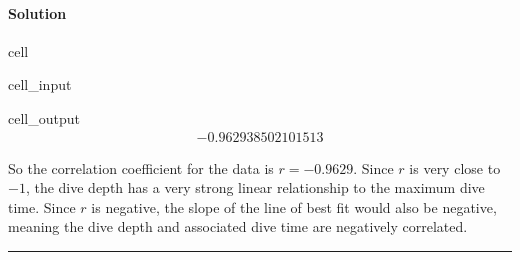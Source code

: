 \documentclass[letterpaper,10pt,english]{jupyterBook}
\begin{document}
\paragraph{Solution}
\label{\detokenize{Ch8 Correlation and Linear Regression/8.4 The Correlation Coefficient:solution}}
\begin{sphinxuseclass}{cell}\begin{sphinxVerbatimInput}

\begin{sphinxuseclass}{cell_input}
\begin{sphinxVerbatim}[commandchars=\\\{\}]

\end{sphinxVerbatim}

\end{sphinxuseclass}\end{sphinxVerbatimInput}
\begin{sphinxVerbatimOutput}

\begin{sphinxuseclass}{cell_output}\begin{equation*}
\begin{split}-0.962938502101513\end{split}
\end{equation*}
\end{sphinxuseclass}\end{sphinxVerbatimOutput}

\end{sphinxuseclass}
\sphinxAtStartPar
So the correlation coefficient for the data is \(r = -0.9629\). Since \(r\) is very close to \(-1\), the dive depth has a very strong linear relationship to the maximum dive time. Since \(r\) is negative, the slope of the line of best fit would also be negative, meaning the dive depth and associated dive time are negatively correlated.


\bigskip\hrule\bigskip
\end{document}
